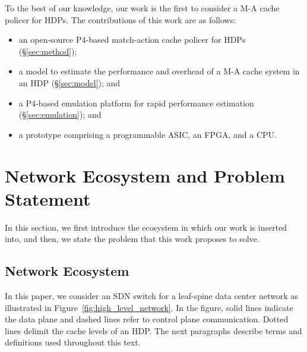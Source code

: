 To the best of our knowledge, our work is the first to consider a M-A cache policer for HDPs. The contributions of this work are as follows: 
\begin{itemize}[noitemsep,topsep=0pt]
	\item an open-source P4-based match-action cache policer for HDPs (\S\ref{sec:method});
	\item a model to estimate the performance and overhead of a M-A cache system in an HDP (\S\ref{sec:model}); and
	\item a P4-based emulation platform for rapid performance estimation (\S\ref{sec:emulation}); and 
	\item a prototype comprising a programmable ASIC, an FPGA, and a CPU.
\end{itemize}



\section{Network Ecosystem and Problem Statement}\label{sec:eco_pro}


In this section, we first introduce the ecosystem in which our work is inserted into, and then, we state the problem that this work proposes to solve.

\subsection{Network Ecosystem}\label{sec:eco}

In this paper, we consider an SDN switch for a leaf-spine data center network as illustrated in Figure~\ref{fig:high_level_network}. In the figure, solid lines indicate the data plane and dashed lines refer to control plane communication. Dotted lines delimit the cache levels of an HDP. The next paragraphs describe terms and definitions used throughout this text.

